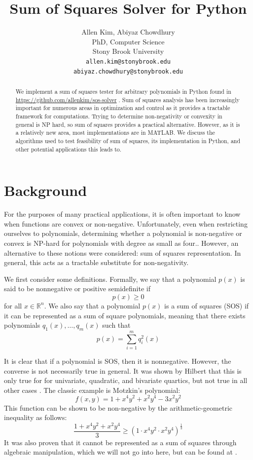 \documentclass{article}
\title{Sum of Squares Solver for Python}
\author{
  Allen Kim, Abiyaz Chowdhury \\
  PhD, Computer Science\\
  Stony Brook University\\
  \texttt{allen.kim@stonybrook.edu} \\
   \texttt{abiyaz.chowdhury@stonybrook.edu} \\
}
\begin{document}

\maketitle

\begin{abstract}
    We implement a sum of squares tester for arbitrary polynomials in Python found in \url{https://github.com/allenkim/sos-solver} . Sum of squares analysis has been increasingly important for numerous areas in optimization and control as it provides a tractable framework for computations. Trying to determine non-negativity or convexity in general is NP hard, so sum of squares provides a practical alternative. However, as it is a relatively new area, most implementations are in MATLAB. We discuss the algorithms used to test feasibility of sum of squares, its implementation in Python, and other potential applications this leads to.
\end{abstract}

\section{Background}

For the purposes of many practical applications, it is often important to know when functions are convex or non-negative. Unfortunately, even when restricting ourselves to polynomials, determining whether a polynomial is non-negative or convex is NP-hard for polynomials with degree as small as four.. However, an alternative to these notions were considered: sum of squares representation. In general, this acts as a tractable substitute for non-negativity.

We first consider some definitions. Formally, we say that a polynomial $p(x)$ is said to be nonnegative or positive semidefinite if \[p(x) \ge 0\] 
for all $x \in \mathbb{R}^n$. We also say that a
polynomial $p(x)$ is a sum of squares (SOS) if it can be represented as a sum of square polynomials, meaning that there exists polynomials $q_1(x),\ldots,q_m(x)$ such that \[p(x) = \sum_{i=1}^m q_i^2(x)\]

It is clear that if a polynomial is SOS, then it is nonnegative. However, the converse is not necessarily true in general. It was shown by Hilbert that this is only true for for univariate, quadratic, and bivariate quartics, but not true in all other cases \cite{sos_convex}. The classic example is Motzkin's polynomial:
\[f(x,y) = 1 + x^4y^2 + x^2y^4 - 3x^2y^2\]
This function can be shown to be non-negative by the arithmetic-geometric inequality as follows:
\[\frac{1+x^4y^2 + x^2y^4}{3} \ge (1 \cdot x^4y^2 \cdot x^2y^4)^\frac{1}{3}\]
It was also proven that it cannot be represented as a sum of squares through algebraic manipulation, which we will not go into here, but can be found at \cite{hilbert}.
\end{document}
